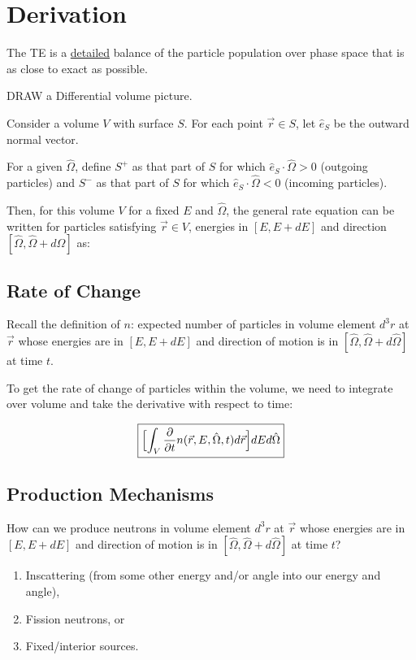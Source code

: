 \documentclass[12pt]{article}
\newcommand{\vOmega}{\ensuremath{\hat{\Omega}}}
\begin{document}
\section*{Derivation}
The TE is a \underline{detailed} balance of the particle population over phase space that is as close to exact as possible. 

DRAW a Differential volume picture.

Consider a volume $V$ with surface $S$. For each point $\vec{r} \in S$, let $\hat{e}_S$ be the outward normal vector.

For a given $\vOmega$, define $S^+$ as that part of $S$ for which $\hat{e}_S \cdot \vOmega > 0$ (outgoing particles) and $S^-$ as that part of $S$ for which $\hat{e}_S \cdot \vOmega < 0$ (incoming particles).

Then, for this volume $V$ for a fixed $E$ and $\vOmega$, the general rate equation can be written for particles satisfying $\vec{r} \in V$, energies in $[E, E+dE]$ and direction $[\vOmega, \vOmega + d\vOmega]$ as:

\hspace*{3 em} 

\subsection*{Rate of Change}
Recall the definition of $n$: expected number of particles in volume element $d^3r$ at $\vec{r}$ whose energies are in $[E, E + dE]$ and direction of motion is in $[\vOmega, \vOmega + d\vOmega]$ at time $t$.

To get the rate of change of particles within the volume, we need to integrate over volume and take the derivative with respect to time:

\[\boxed{\Bigl[ \int_V \frac{\partial}{\partial t} n(\vec{r}, E, \vOmega, t) d\vec{r} \Bigr] dE d\vOmega }\]


\subsection*{Production Mechanisms}
How can we produce neutrons in volume element $d^3r$ at $\vec{r}$ whose energies are in $[E, E + dE]$ and direction of motion is in $[\vOmega, \vOmega + d\vOmega]$ at time $t$?
%
\begin{enumerate}
\item Inscattering (from some other energy and/or angle into our energy and angle),
\item Fission neutrons, or
\item Fixed/interior sources.
\end{enumerate}
\end{document}
